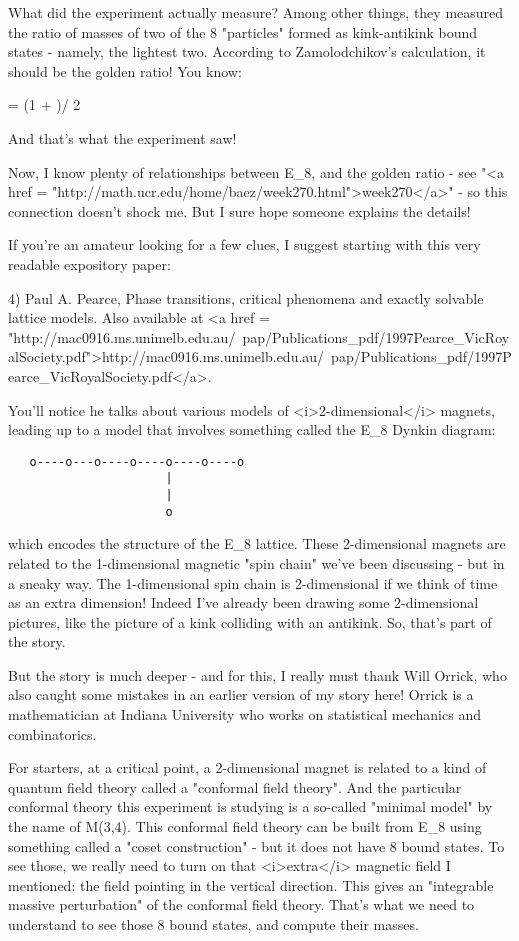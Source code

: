 What did the experiment actually measure?  Among other things,
they measured the ratio of masses of two of the 8 "particles"
formed as kink-antikink bound states - namely, the lightest two.
According to Zamolodchikov's calculation, it should be the golden
ratio!  You know:

\Phi  = (1 + )/ 2

And that's what the experiment saw!

Now, I know plenty of relationships between E_{8}, and the
golden ratio - see "<a href =
"http://math.ucr.edu/home/baez/week270.html">week270</a>" - so
this connection doesn't shock me.  But I sure hope someone explains
the details!

If you're an amateur looking for a few clues, I suggest starting with
this very readable expository paper:

4) Paul A. Pearce, Phase transitions, critical phenomena and exactly
solvable lattice models.  Also available at 
<a href = "http://mac0916.ms.unimelb.edu.au/~pap/Publications_pdf/1997Pearce_VicRoyalSociety.pdf">http://mac0916.ms.unimelb.edu.au/~pap/Publications_pdf/1997Pearce_VicRoyalSociety.pdf</a>.

You'll notice he talks about various models of <i>2-dimensional</i> magnets,
leading up to a model that involves something called the E_{8}
Dynkin diagram:

\begin{verbatim}
   o----o---o----o----o----o----o
                      |
                      |
                      o
\end{verbatim}
    
which encodes the structure of the E_{8} lattice.  
These 2-dimensional magnets are related to the 1-dimensional
magnetic "spin chain" we've been discussing - but in a sneaky
way.  The 1-dimensional spin chain is 2-dimensional if we think of time
as an extra dimension!  Indeed I've already been drawing some 
2-dimensional pictures, like the picture of a kink colliding with an
antikink.   So, that's part of the story.  

But the story is much deeper - and for this, I really must thank 
Will Orrick, who also caught some mistakes in an earlier version
of my story here!  Orrick is a mathematician at Indiana University
who works on statistical mechanics and combinatorics.

For starters, at a critical point, a 2-dimensional magnet is related
to a kind of quantum field theory called a "conformal field
theory".  And the particular conformal theory this experiment is
studying is a so-called "minimal model" by the name of
M(3,4).  This conformal field theory can be built from E_{8}
using something called a "coset construction" - but it does
not have 8 bound states.  To see those, we really need to turn on that
<i>extra</i> magnetic field I mentioned: the field pointing in the
vertical direction.  This gives an "integrable massive
perturbation" of the conformal field theory.  That's what we need
to understand to see those 8 bound states, and compute their masses.

